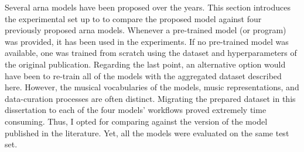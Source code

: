 
Several \gls{arna} models have been proposed over the years.
This section introduces the experimental set up to to
compare the proposed model against four previously proposed
\gls{arna} models. Whenever a pre-trained model (or program)
was provided, it has been used in the experiments. If no
pre-trained model was available, one was trained from
scratch using the dataset and hyperparameters of the
original publication. Regarding the last point, an
alternative option would have been to re-train all of the
models with the aggregated dataset described here. However,
the musical vocabularies of the models, music
representations, and data-curation processes are often
distinct. Migrating the prepared dataset in this
dissertation to each of the four models' workflows proved
extremely time consuming. Thus, I opted for comparing
against the version of the model published in the
literature. Yet, all the models were evaluated on the same
test set.
